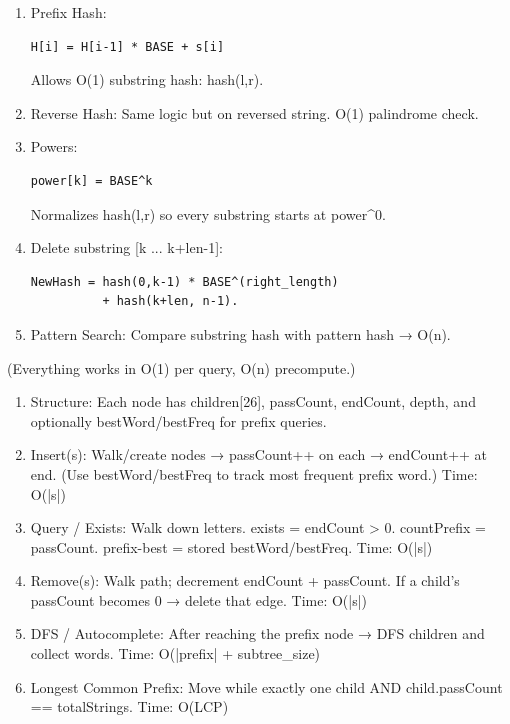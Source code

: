 \begin{enumerate}
    \item Prefix Hash:
    \begin{lstlisting}
H[i] = H[i-1] * BASE + s[i]
    \end{lstlisting}
    Allows O(1) substring hash: hash(l,r).

    \item Reverse Hash: Same logic but on reversed string. O(1) palindrome check.

    \item Powers:
    \begin{lstlisting}
power[k] = BASE^k
    \end{lstlisting}
    Normalizes hash(l,r) so every substring starts at power\textasciicircum0.

    \item Delete substring [k ... k+len-1]:
    \begin{lstlisting}
NewHash = hash(0,k-1) * BASE^(right_length)
          + hash(k+len, n-1).
    \end{lstlisting}

    \item Pattern Search: Compare substring hash with pattern hash → O(n).
\end{enumerate}

(Everything works in O(1) per query, O(n) precompute.)


\begin{enumerate}
    \item Structure: Each node has children[26], passCount, endCount, depth, and optionally bestWord/bestFreq for prefix queries.
    \item Insert(s): Walk/create nodes → passCount++ on each → endCount++ at end. (Use bestWord/bestFreq to track most frequent prefix word.) Time: O(|s|)
    \item Query / Exists: Walk down letters. exists = endCount > 0. countPrefix = passCount. prefix-best = stored bestWord/bestFreq. Time: O(|s|)
    \item Remove(s): Walk path; decrement endCount + passCount. If a child’s passCount becomes 0 → delete that edge. Time: O(|s|)
    \item DFS / Autocomplete: After reaching the prefix node → DFS children and collect words. Time: O(|prefix| + subtree\_size)
    \item Longest Common Prefix: Move while exactly one child AND child.passCount == totalStrings. Time: O(LCP)
\end{enumerate}

